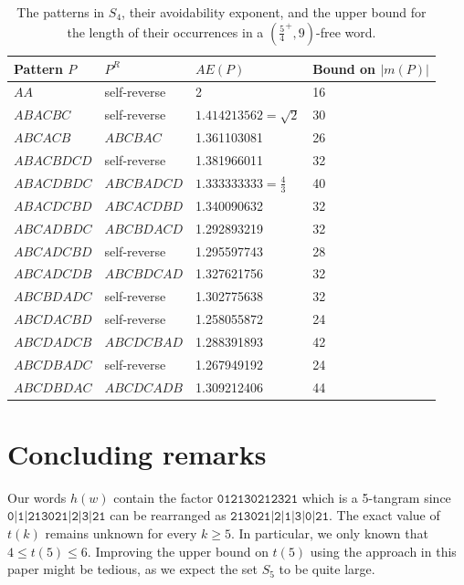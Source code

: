 \documentclass[final]{dmtcs-episciences}
\def\paren#1{\left( #1 \right)}
\renewcommand{\le}{\leqslant}
\renewcommand{\ge}{\geqslant}
\theoremstyle{plain}
\theoremstyle{definition}
\theoremstyle{remark}
\begin{document}
\begin{table}[h]
\begin{center}
{\begin{tabular}{|l|l|l|l|}
\hline
Pattern $P$ & $P^R$ & $AE(P)$ & Bound on $|m(P)|$\\
\hline
$AA$ & self-reverse & 2 & 16\\
\hline
$ABACBC$ & self-reverse & $1.414213562=\sqrt{2}$ & 30\\
\hline
$ABCACB$ & $ABCBAC$ & 1.361103081 & 26\\
\hline
$ABACBDCD$ & self-reverse & 1.381966011 & 32\\
\hline
$ABACDBDC$ & $ABCBADCD$ & $1.333333333=\tfrac43$ & 40\\
\hline
$ABACDCBD$ & $ABCACDBD$ & 1.340090632 & 32\\
\hline
$ABCADBDC$ & $ABCBDACD$ & 1.292893219 & 32\\
\hline
$ABCADCBD$ & self-reverse & 1.295597743 & 28\\
\hline
$ABCADCDB$ & $ABCBDCAD$ & 1.327621756 & 32\\
\hline
$ABCBDADC$ & self-reverse & 1.302775638 & 32\\
\hline
$ABCDACBD$ & self-reverse & 1.258055872 & 24\\
\hline
$ABCDADCB$ & $ABCDCBAD$ & 1.288391893 & 42\\
\hline
$ABCDBADC$ & self-reverse & 1.267949192 & 24\\
\hline
$ABCDBDAC$ & $ABCDCADB$ & 1.309212406 & 44\\
\hline
\end{tabular}}
\end{center}
\caption{The patterns in $S_4$, their avoidability exponent, and the upper bound for the length of their occurrences in a $\paren{\tfrac54^+,9}$-free word.}
\end{table}

\section{Concluding remarks}\label{conclusion}
Our words $h(w)$ contain the factor $\texttt{012130212321}$
which is a 5-tangram since $\texttt{0|1|213021|2|3|21}$ can be rearranged as $\texttt{213021|2|1|3|0|21}$.
The exact value of $t(k)$ remains unknown for every $k\ge5$. In particular, we only known that $4\le t(5)\le6$.
Improving the upper bound on $t(5)$ using the approach in this paper might be tedious, as we expect
the set $S_5$ to be quite large. 
\end{document}
